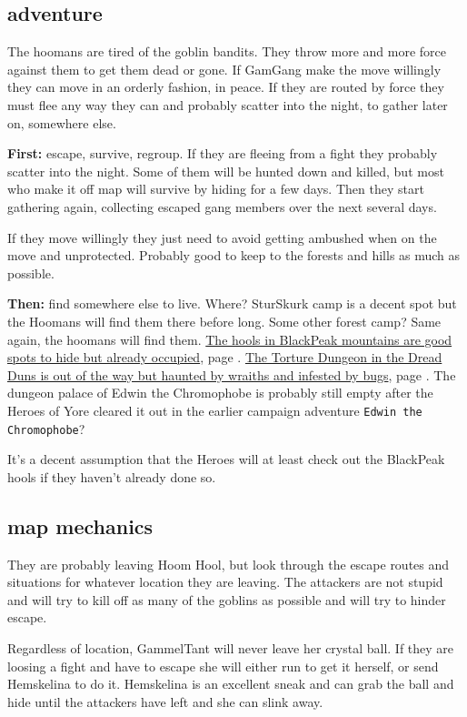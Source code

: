 \subsection*{adventure}

The hoomans are tired of the goblin bandits. They throw more and more force against them to get them dead or gone. If GamGang make the move willingly they can move in an orderly fashion, in peace. If they are routed by force they must flee any way they can and probably scatter into the night, to gather later on, somewhere else.

\textbf{First:} escape, survive, regroup. If they are fleeing from a fight they probably scatter into the night. Some of them will be hunted down and killed, but most who make it off map will survive by hiding for a few days. Then they start gathering again, collecting escaped gang members over the next several days.

If they move willingly they just need to avoid getting ambushed when on the move and unprotected. Probably good to keep to the forests and hills as much as possible.

\textbf{Then:} find somewhere else to live. Where? SturSkurk camp is a decent spot but the Hoomans will find them there before long. Some other forest camp? Same again, the hoomans will find them. 
\hyperref[appendixmountainhoolgoblins]{The hools in BlackPeak mountains are good spots to hide but already occupied}, page \pageref{appendixmountainhoolgoblins}. 
\hyperref[appendixtorturous]{The Torture Dungeon in the Dread Duns is out of the way but haunted by wraiths and infested by bugs}, page \pageref{appendixtorturous}. 
The dungeon palace of Edwin the Chromophobe is probably still empty after the Heroes of Yore cleared it out in the earlier campaign adventure \texttt{Edwin the Chromophobe}?

It's a decent assumption that the Heroes will at least check out the BlackPeak hools if they haven't already done so. 


\subsection*{map mechanics}

They are probably leaving Hoom Hool, but look through the escape routes and situations for whatever location they are leaving. The attackers are not stupid and will try to kill off as many of the goblins as possible and will try to hinder escape.

Regardless of location, GammelTant will never leave her crystal ball. If they are loosing a fight and have to escape she will either run to get it herself, or send Hemskelina to do it. Hemskelina is an excellent sneak and can grab the ball and hide until the attackers have left and she can slink away.



